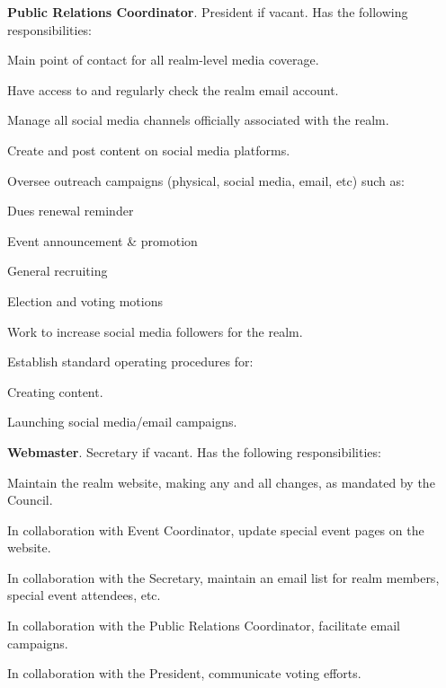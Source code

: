 \documentclass[12pt]{article}
\begin{document}
\begin{level}
\begin{level}
    \item \textbf{Public Relations Coordinator}. President if vacant. Has the following responsibilities:
    \begin{level}
        \item Main point of contact for all realm-level media coverage.
        \item Have access to and regularly check the realm email account.
        \item Manage all social media channels officially associated with the realm.
        \item Create and post content on social media platforms.
        \item Oversee outreach campaigns (physical, social media, email, etc) such as:
        \begin{level}
            \item Dues renewal reminder
            \item Event announcement \& promotion
            \item General recruiting
            \item Election and voting motions
        \end{level}
        \item Work to increase social media followers for the realm.
        \item Establish standard operating procedures for:
        \begin{level}
            \item Creating content.
            \item Launching social media/email campaigns.
        \end{level}
    \end{level}
    \item \textbf{Webmaster}. Secretary if vacant. Has the following responsibilities:
    \begin{level}
        \item Maintain the realm website, making any and all changes, as mandated by the Council.
        \item In collaboration with Event Coordinator, update special event pages on the website.
        \item In collaboration with the Secretary, maintain an email list for realm members, special event attendees, etc.
        \item In collaboration with the Public Relations Coordinator, facilitate email campaigns.
        \item In collaboration with the President, communicate voting efforts.

\end{level}
\end{level}
\end{level}
\end{document}
